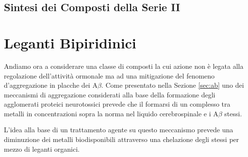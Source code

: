 \documentclass[a4paper, 12pt]{article}
\begin{document}
\subsection{Sintesi dei Composti della Serie II}


\section{Leganti Bipiridinici}
\label{sec:byp}
Andiamo ora a considerare una classe di composti la cui azione non è legata alla regolazione dell'attività ormonale ma ad una mitigazione del fenomeno d'aggregazione in placche dei A$\beta$. Come presentato nella Sezione \ref{sec:ab} uno dei meccanismi di aggregazione considerati alla base della formazione degli agglomerati proteici neurotossici prevede che il formarsi di un complesso tra metalli in concentrazioni sopra la norma nel liquido cerebrospinale e i A$\beta$ stessi.

L'idea alla base di un trattamento agente su questo meccanismo prevede una diminuzione dei metalli biodisponibili attraverso una chelazione degli stessi per mezzo di leganti organici.
\end{document}
